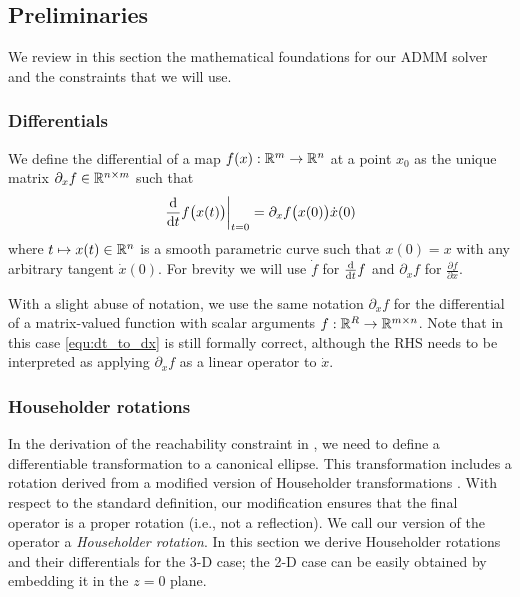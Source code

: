 \documentclass[journal]{IEEEtran}  %
\begin{document}
\subsection{Preliminaries}
We review in this section the mathematical foundations for our ADMM solver and the constraints that we will use.

\subsubsection{Differentials}
We define the differential of a map $f(x):\mathbb{R}^{m}{}\to\mathbb{R}^{n}{}$ at a point $x_0$ as the unique matrix $\partial_x f \in\mathbb{R}^{n\times m}{}$ such that
\begin{equation}\label{equ:dt_to_dx}
  \left.\frac{\mathrm{d} }{\mathrm{d} t} f\bigl(x(t)\bigr)\right|_{t=0}=\partial_x f\bigl(x(0)\bigr) \dot{x}(0)
\end{equation}
where $t\mapsto x(t)\in\mathbb{R}^{n}{}$ is a smooth parametric curve such that $x(0)=x$ with any arbitrary tangent $\dot{x}(0)$. For brevity we will use $\dot f$ for $\frac{\mathrm{d} }{\mathrm{d} t} f$ and $\partial_x f$ for $\frac{\partial f}{\partial x}$. 

With a slight abuse of notation, we use the same notation $\partial_xf$ for the differential of a matrix-valued function with scalar arguments $f:\mathbb{R}^{R}{}\to\mathbb{R}^{m\times n}{}$.  Note that in this case \eqref{equ:dt_to_dx} is still formally correct, although the RHS needs to be interpreted as applying $\partial_x f$ as a linear operator to $\dot{x}$.

 \subsubsection{Householder rotations}\label{sec:householder}
 In the derivation of the reachability constraint in , we need to define a differentiable transformation to a canonical ellipse. This transformation includes a rotation derived from a modified version of Householder transformations \cite{householder1958unitary}. With respect to the standard definition, our modification ensures that the final operator is a proper rotation (i.e., not a reflection). We call our version of the operator a \emph{Householder rotation}. In this section we derive Householder rotations and their differentials for the 3-D case; the 2-D case can be easily obtained by embedding it in the $z=0$ plane.
\end{document}
